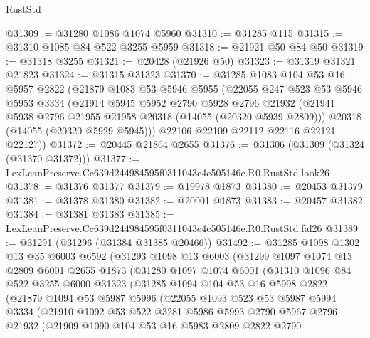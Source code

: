 \begin{lexlean}{RustStd}
\begin{coremodule}
@31309 := @31280 @1086 @1074 @5960
@31310 := @31285 @115
@31315 := @31310 @1085 @84 @522 @3255 @5959
@31318 := @21921 @50 @84 @50
@31319 := @31318 @3255
@31321 := @20428 (@21926 @50)
@31323 := @31319 @31321 @21823
@31324 := @31315 @31323
@31370 := @31285
    @1083
    @104
    @53
    @16
    @5957
    @2822
    (@21879
      @1083
      @53
      @5946
      @5955
      (@22055
        @247
        @523
        @53
        @5946
        @5953
        @3334
        (@21914
          @5945
          @5952
          @2790
          @5928
          @2796
          @21932
          (@21941 @5938 @2796 @21955 @21958 @20318 (@14055 (@20320 @5939 @2809)))
          @20318
          (@14055 (@20320 @5929 @5945)))
        @22106
        @22109
        @22112
        @22116
        @22121
        @22127))
@31372 := @20445 @21864 @2655
@31376 := @31306 (@31309 (@31324 (@31370 @31372)))
@31377 := LexLeanPreserve.Cc639d244984595f0311043c4c505146e.R0.RustStd.look26
@31378 := @31376 @31377
@31379 := @19978 @1873
@31380 := @20453 @31379
@31381 := @31378 @31380
@31382 := @20001 @1873
@31383 := @20457 @31382
@31384 := @31381 @31383
@31385 := LexLeanPreserve.Cc639d244984595f0311043c4c505146e.R0.RustStd.fal26
@31389 := @31291 (@31296 (@31384 @31385 @20466))
@31492 := @31285
    @1098
    @1302
    @13
    @35
    @6003
    @6592
    (@31293
      @1098
      @13
      @6003
      (@31299
        @1097
        @1074
        @13
        @2809
        @6001
        @2655
        @1873
        (@31280
          @1097
          @1074
          @6001
          (@31310
            @1096
            @84
            @522
            @3255
            @6000
            @31323
            (@31285
              @1094
              @104
              @53
              @16
              @5998
              @2822
              (@21879
                @1094
                @53
                @5987
                @5996
                (@22055
                  @1093
                  @523
                  @53
                  @5987
                  @5994
                  @3334
                  (@21910
                    @1092
                    @53
                    @522
                    @3281
                    @5986
                    @5993
                    @2790
                    @5967
                    @2796
                    @21932
                    (@21909
                      @1090
                      @104
                      @53
                      @16
                      @5983
                      @2809
                      @2822
                      @2790

\end{coremodule}
\end{lexlean}
